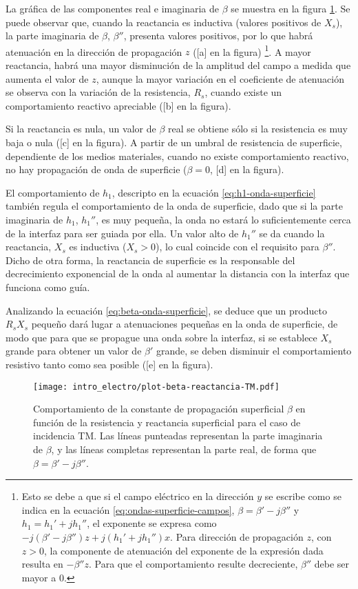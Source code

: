 La gráfica de las componentes real e imaginaria de $\beta$ se muestra en la figura \ref{fig:beta-reactancia-TM}. Se puede observar que, cuando la reactancia es inductiva (valores positivos de $X_s$), la parte imaginaria de $\beta$, $\beta''$, presenta valores positivos, por lo que habrá atenuación en la dirección de propagación $z$ ([a] en la figura) \footnote{Esto se debe a que si el campo eléctrico en la dirección $y$ se escribe como se indica en la ecuación \ref{eq:ondas-superficie-campos}, $\beta=\beta'-j\beta''$ y $h_1 = h_1'+jh_1''$, el exponente se expresa como $-j(\beta'-j\beta'')z + j(h_1'+jh_1'')x$. Para dirección de propagación $z$, con $z>0$, la componente de atenuación del exponente de la expresión dada resulta en $-\beta'' z$. Para que el comportamiento resulte decreciente, $\beta''$ debe ser mayor a $0$.}. A mayor reactancia, habrá una mayor disminución de la amplitud del campo a medida que aumenta el valor de $z$, aunque la mayor variación en el coeficiente de atenuación se observa con la variación de la resistencia, $R_s$, cuando existe un comportamiento reactivo apreciable ([b] en la figura).

Si la reactancia es nula, un valor de $\beta$ real se obtiene sólo si la resistencia es muy baja o nula ([c] en la figura). A partir de un umbral de resistencia de superficie, dependiente de los medios materiales, cuando no existe comportamiento reactivo, no hay propagación de onda de superficie ($\beta=0$, [d] en la figura).

El comportamiento de $h_1$, descripto en la ecuación \ref{eq:h1-onda-superficie} también regula el comportamiento de la onda de superficie, dado que si la parte imaginaria de $h_1$, $h_1''$, es muy pequeña, la onda no estará lo suficientemente cerca de la interfaz para ser guiada por ella. Un valor alto de $h_1''$ se da cuando la reactancia, $X_s$ es inductiva ($X_s>0$), lo cual coincide con el requisito para $\beta''$. Dicho de otra forma, la reactancia de superficie es la responsable del decrecimiento exponencial de la onda al aumentar la distancia con la interfaz que funciona como guía.

Analizando la ecuación \ref{eq:beta-onda-superficie}, se deduce que un producto $R_s X_s$ pequeño dará lugar a atenuaciones pequeñas en la onda de superficie, de modo que para que se propague una onda sobre la interfaz, si se establece $X_s$ grande para obtener un valor de $\beta'$ grande, se deben disminuir el comportamiento resistivo tanto como sea posible ([e] en la figura).

\begin{figure}[htp]
	\centering
	\texttt{[image: intro\_electro/plot-beta-reactancia-TM.pdf]}
	\caption{Comportamiento de la constante de propagación superficial $\beta$ en función de la resistencia y reactancia superficial para el caso de incidencia TM. Las líneas punteadas representan la parte imaginaria de $\beta$, y las líneas completas representan la parte real, de forma que $\beta = \beta' - j\beta''$.}
	\label{fig:beta-reactancia-TM}
\end{figure}

